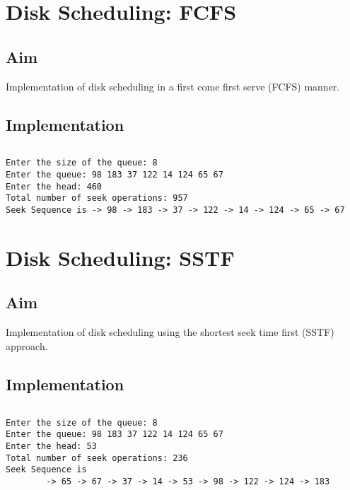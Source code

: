 \section{Disk Scheduling: FCFS}
\label{sec:disk-fcfs}

\subsection{Aim}
Implementation of disk scheduling in a
first come first serve (FCFS) manner.

\subsection{Implementation}

\inputminted[fontsize=\footnotesize,autogobble]{c}{code/disk_fcfs.c}

\begin{lstlisting}[style=output]
Enter the size of the queue: 8
Enter the queue: 98 183 37 122 14 124 65 67
Enter the head: 460
Total number of seek operations: 957
Seek Sequence is -> 98 -> 183 -> 37 -> 122 -> 14 -> 124 -> 65 -> 67
\end{lstlisting}


\section{Disk Scheduling: SSTF}
\label{sec:disk-sstf}

\subsection{Aim}
Implementation of disk scheduling using the
shortest seek time first (SSTF) approach.

\subsection{Implementation}

\inputminted[fontsize=\footnotesize,autogobble]{c}{code/disk_sstf.c}

\begin{lstlisting}[style=output]
Enter the size of the queue: 8
Enter the queue: 98 183 37 122 14 124 65 67
Enter the head: 53
Total number of seek operations: 236
Seek Sequence is 
        -> 65 -> 67 -> 37 -> 14 -> 53 -> 98 -> 122 -> 124 -> 183
\end{lstlisting}
